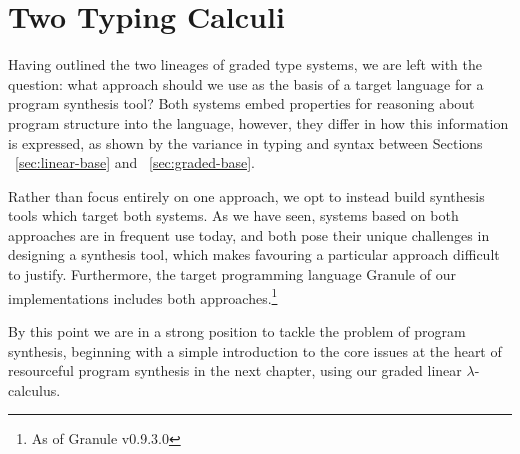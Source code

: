 \section{Two Typing Calculi}
Having outlined the two lineages of graded type systems, we are left with the
question: what approach should we use as the basis of a target language for a
program synthesis tool? Both systems embed properties for reasoning about
program structure into the language, however, they differ in how this
information is expressed, as shown by the variance in typing and syntax between
Sections ~\ref{sec:linear-base} and ~\ref{sec:graded-base}. 

Rather than focus entirely on one approach, we opt to instead build synthesis
tools which target both systems. As we have seen, systems based on both
approaches are in frequent use today, and both pose their unique challenges in
designing a synthesis tool, which makes favouring a particular approach
difficult to justify. Furthermore, the target programming language Granule of
our implementations includes both approaches.\footnote{As of Granule v0.9.3.0}

By this point we are in a strong position to tackle the problem of program
synthesis, beginning with a simple introduction to the core issues at the heart
of resourceful program synthesis in the next chapter, using our graded linear
$\lambda$-calculus. 
